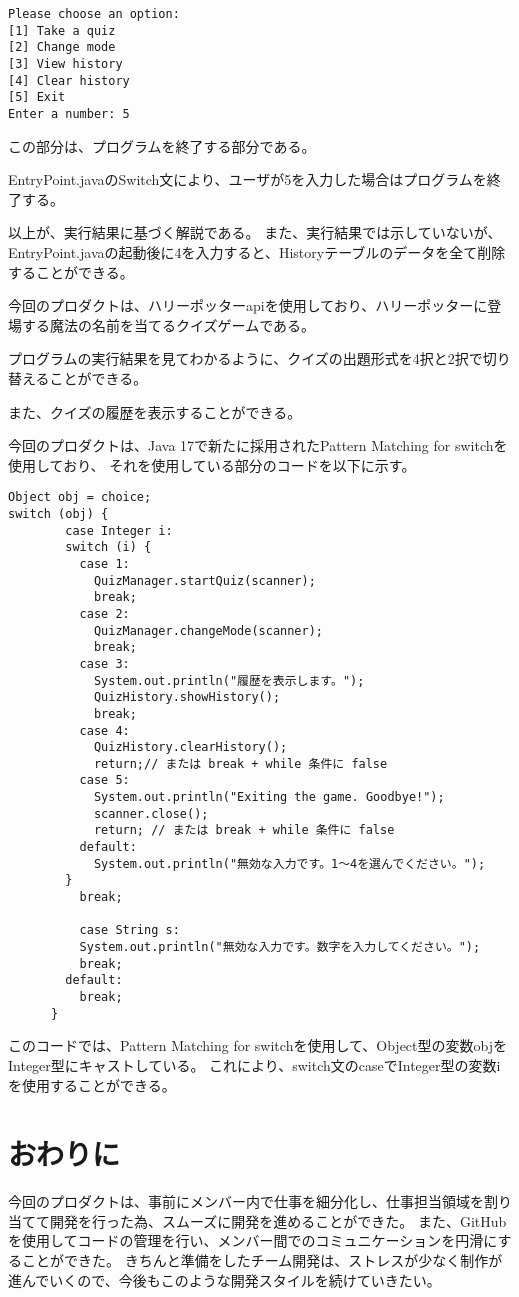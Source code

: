 \documentclass[uplatex,dvipdfmx,a4paper]{jsarticle}
\begin{document}
\begin{lstlisting}[style=result]
  Please choose an option:
[1] Take a quiz
[2] Change mode
[3] View history
[4] Clear history
[5] Exit
Enter a number: 5
\end{lstlisting}
\par この部分は、プログラムを終了する部分である。
\par EntryPoint.javaのSwitch文により、ユーザが5を入力した場合はプログラムを終了する。
\par 以上が、実行結果に基づく解説である。
また、実行結果では示していないが、EntryPoint.javaの起動後に4を入力すると、Historyテーブルのデータを全て削除することができる。
\par 今回のプロダクトは、ハリーポッターapiを使用しており、ハリーポッターに登場する魔法の名前を当てるクイズゲームである。
\par プログラムの実行結果を見てわかるように、クイズの出題形式を4択と2択で切り替えることができる。
\par また、クイズの履歴を表示することができる。
\par 今回のプロダクトは、Java 17で新たに採用されたPattern Matching for switchを使用しており、
それを使用している部分のコードを以下に示す。
\begin{lstlisting}[style=source]
  Object obj = choice;
switch (obj) {
        case Integer i:
        switch (i) {
          case 1:
            QuizManager.startQuiz(scanner);
            break;
          case 2:
            QuizManager.changeMode(scanner);
            break;
          case 3:
            System.out.println("履歴を表示します。");
            QuizHistory.showHistory();
            break;
          case 4:
            QuizHistory.clearHistory();
            return;// または break + while 条件に false
          case 5:
            System.out.println("Exiting the game. Goodbye!");
            scanner.close();
            return; // または break + while 条件に false
          default:
            System.out.println("無効な入力です。1〜4を選んでください。");
        }
          break;
      
          case String s:
          System.out.println("無効な入力です。数字を入力してください。");
          break;
        default:
          break;
      } 
\end{lstlisting}

このコードでは、Pattern Matching for switchを使用して、Object型の変数objをInteger型にキャストしている。
これにより、switch文のcaseでInteger型の変数iを使用することができる。






\section{おわりに}
今回のプロダクトは、事前にメンバー内で仕事を細分化し、仕事担当領域を割り当てて開発を行った為、スムーズに開発を進めることができた。
また、GitHubを使用してコードの管理を行い、メンバー間でのコミュニケーションを円滑にすることができた。
きちんと準備をしたチーム開発は、ストレスが少なく制作が進んでいくので、今後もこのような開発スタイルを続けていきたい。
\end{document}
